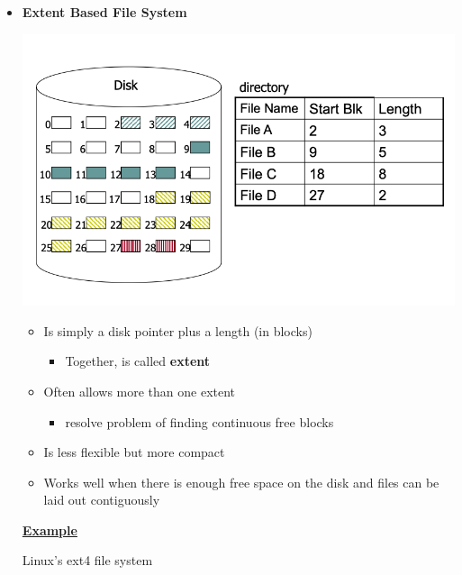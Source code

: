 \documentclass[12pt]{article}
\begin{document}
\begin{itemize}
    \item \textbf{Extent Based File System}

    \begin{center}
    \includegraphics[width=\linewidth]{images/midterm_1_solution_14.png}
    \end{center}

    \begin{itemize}
        \item Is simply a disk pointer plus a length (in blocks)
        \begin{itemize}
            \item Together, is called \textbf{extent}
        \end{itemize}
        \item Often allows more than one extent
        \begin{itemize}
            \item resolve problem of finding continuous free blocks
        \end{itemize}
        \item Is less flexible but more compact
        \item Works well when there is enough free space on the disk and
        files can be laid out contiguously
    \end{itemize}

    \bigskip

    \underline{\textbf{Example}}

    \bigskip

    Linux's ext4 file system
\end{itemize}
\end{document}
